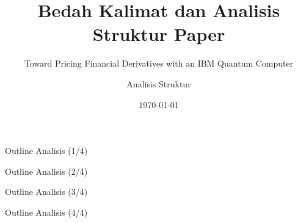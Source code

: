 \documentclass[aspectratio=169]{beamer}
\title{Bedah Kalimat dan Analisis Struktur Paper}
\subtitle{Toward Pricing Financial Derivatives with an IBM Quantum Computer}
\author{Analisis Struktur}
\date{\today}
\begin{document}
\begin{frame}
    \titlepage
\end{frame}

\begin{frame}{Outline Analisis (1/4)}
    \tableofcontents[sections={1-2}]
\end{frame}

\begin{frame}{Outline Analisis (2/4)}
    \tableofcontents[sections={3}]
\end{frame}

\begin{frame}{Outline Analisis (3/4)}
    \tableofcontents[sections={4-6}]
\end{frame}

\begin{frame}{Outline Analisis (4/4)}
    \tableofcontents[sections={7-8}]
\end{frame}









\end{document}
